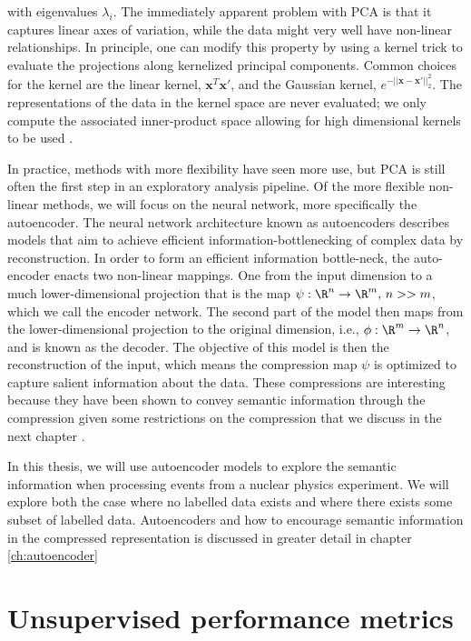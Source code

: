 \noindent with eigenvalues $\lambda_i$. The immediately apparent problem with PCA is that it captures linear axes of variation, while the data might very well have non-linear relationships. In principle, one can modify this property by using a kernel trick to evaluate the projections along kernelized principal components. Common choices for the kernel are the linear kernel, $\boldsymbol{x}^T\boldsymbol{x}'$, and the Gaussian kernel, $e^{-||\boldsymbol{x} - \boldsymbol{x}'||^2_2}$. The representations of the data in the kernel space are never evaluated; we only compute the associated inner-product space allowing for high dimensional kernels to be used \cite{Scholkopf1996}. 

In practice, methods with more flexibility have seen more use, but PCA is still often the first step in an exploratory analysis pipeline. Of the more flexible non-linear methods, we will focus on the neural network, more specifically the autoencoder. The neural network architecture known as autoencoders describes models that aim to achieve efficient information-bottlenecking of complex data by reconstruction. In order to form an efficient information bottle-neck, the auto-encoder enacts two non-linear mappings. One from the input dimension to a much lower-dimensional projection that is the map $\psi: \R^n \rightarrow \R^m,\, n >> m$, which we call the encoder network. The second part of the model then maps from the lower-dimensional projection to the original dimension, i.e., $\phi: \R^m \rightarrow \R^n$, and is known as the decoder. The objective of this model is then the reconstruction of the input, which means the compression map $\psi$ is optimized to capture salient information about the data. These compressions are interesting because they have been shown to convey semantic information through the compression given some restrictions on the compression that we discuss in the next chapter \cite{Fertig}.

In this thesis, we will use autoencoder models to explore the semantic information when processing events from a nuclear physics experiment. We will explore both the case where no labelled data exists and where there exists some subset of labelled data. Autoencoders and how to encourage semantic information in the compressed representation is discussed in greater detail in chapter \ref{ch:autoencoder}

\section{Unsupervised performance metrics}\label{sec:unsupervised_perf}

